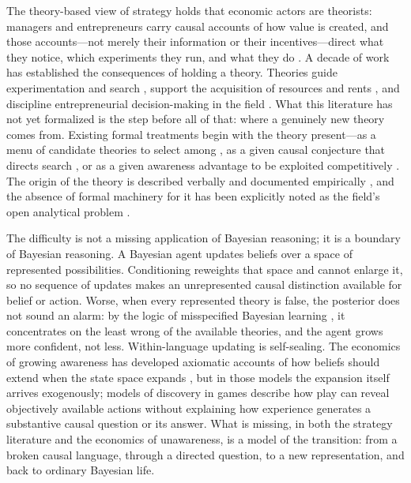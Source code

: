\documentclass[11pt]{article}
\theoremstyle{definition}
\begin{document}
The theory-based view of strategy holds that economic actors are theorists:
managers and entrepreneurs carry causal accounts of how value is created, and
those accounts---not merely their information or their incentives---direct
what they notice, which experiments they run, and what they do
\citep{FelinZenger2017,FelinGambardellaZenger2024}.  A decade of work has
established the consequences of holding a theory.  Theories guide
experimentation and search \citep{CamuffoEtAl2020,ChavdaGansStern2024},
support the acquisition of resources and rents \citep{EhrigZenger2024}, and
discipline entrepreneurial decision-making in the field
\citep{CamuffoEtAl2024}.  What this literature has not yet formalized is the
step before all of that: where a genuinely new theory comes from.  Existing
formal treatments begin with the theory present---as a menu of candidate
theories to select among \citep{CamuffoEtAl2024}, as a given causal
conjecture that directs search \citep{ChavdaGansStern2024}, or as a given
awareness advantage to be exploited competitively \citep{EhrigZenger2024}.
The origin of the theory is described verbally and documented empirically
\citep{OttHannah2024}, and the absence of formal machinery for it has been
explicitly noted as the field's open analytical problem
\citep{FelinGambardellaZenger2024}.

The difficulty is not a missing application of Bayesian reasoning; it is a
boundary of Bayesian reasoning.  A Bayesian agent updates beliefs over a
space of represented possibilities.  Conditioning reweights that space and
cannot enlarge it, so no sequence of updates makes an unrepresented causal
distinction available for belief or action.  Worse, when every represented
theory is false, the posterior does not sound an alarm: by the logic of
misspecified Bayesian learning \citep{Berk1966}, it concentrates on the least
wrong of the available theories, and the agent grows more confident, not
less.  Within-language updating is self-sealing.  The economics of growing
awareness has developed axiomatic accounts of how beliefs should extend when
the state space expands \citep{KarniViero2013,KarniViero2017,Viero2021}, but
in those models the expansion itself arrives exogenously; models of discovery
in games describe how play can reveal objectively available actions
\citep{Schipper2021} without explaining how experience generates a
substantive causal question or its answer.  What is missing, in both the
strategy literature and the economics of unawareness, is a model of the
transition: from a broken causal language, through a directed question, to a
new representation, and back to ordinary Bayesian life.
\end{document}
